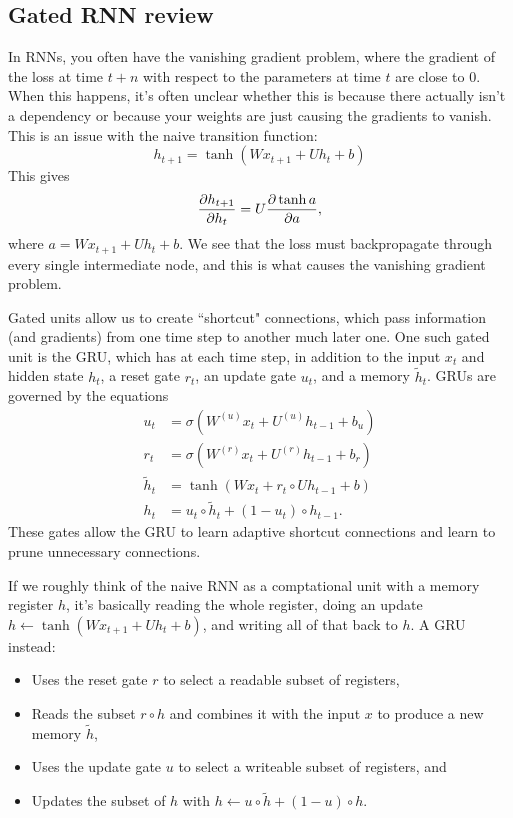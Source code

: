 \subsection{Gated RNN review}

In RNNs, you often have the vanishing gradient problem, where the gradient of the loss at time $t+n$ with respect to the parameters at time $t$ are close to 0. When this happens, it's often unclear whether this is because there actually isn't a dependency or because your weights are just causing the gradients to vanish. This is an issue with the naive transition function:
$$h_{t+1} = \tanh \left(Wx_{t+1} + Uh_t + b\right)$$
This gives 
$$\frac{\partial h_{t+1}}{\partial h_t} = U\frac{\partial \tanh a}{\partial a},$$
where $a = Wx_{t+1} + Uh_t + b$. We see that the loss must backpropagate through every single intermediate node, and this is what causes the vanishing gradient problem.

Gated units allow us to create ``shortcut" connections, which pass information (and gradients) from one time step to another much later one. One such gated unit is the GRU, which has at each time step, in addition to the input $x_t$ and hidden state $h_t$, a reset gate $r_t$, an update gate $u_t$, and a memory $\tilde{h}_t$. GRUs are governed by the equations
\begin{align*}
u_t &= \sigma\left(W^{(u)}x_t + U^{(u)}h_{t-1} + b_u\right) \\
r_t &= \sigma\left(W^{(r)}x_t + U^{(r)}h_{t-1} + b_r\right) \\
\tilde{h}_t &= \tanh\left(Wx_t + r_t \circ Uh_{t-1} + b\right) \\
h_t &= u_t \circ \tilde{h}_t + (1 - u_t) \circ h_{t-1}.
\end{align*}
These gates allow the GRU to learn adaptive shortcut connections and learn to prune unnecessary connections.

If we roughly think of the naive RNN as a comptational unit with a memory register $h$, it's basically reading the whole register, doing an update $h \leftarrow \tanh\left(Wx_{t+1} + Uh_t + b\right)$, and writing all of that back to $h$. A GRU instead:
\begin{itemize}
\item Uses the reset gate $r$ to select a readable subset of registers,
\item Reads the subset $r \circ h$ and combines it with the input $x$ to produce a new memory $\tilde{h}$,
\item Uses the update gate $u$ to select a writeable subset of registers, and
\item Updates the subset of $h$ with $h \leftarrow u \circ \tilde{h} + (1 - u) \circ h$.
\end{itemize}


